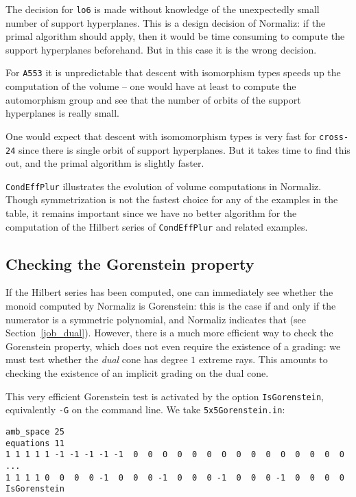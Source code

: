 \documentclass[12pt,a4paper]{scrartcl}
\theoremstyle{definition}
\def\ttt{\texttt}
\begin{document}
The decision for \ttt{lo6} is made without knowledge of the unexpectedly small number of support hyperplanes. This is a design decision of Normaliz: if the primal algorithm should apply, then it would be time consuming to compute the support hyperplanes beforehand. But in this case it is the wrong decision. 

For \ttt{A553} it is unpredictable that descent with isomorphism types speeds up the computation of the volume -- one would have at least to compute the automorphism group and see that the number of orbits of the support hyperplanes is really small.

One would expect that descent with isomomorphism types is very fast for \ttt{cross-24} since there is single orbit of support hyperplanes. But it takes time to find this out, and the primal algorithm is slightly faster.

\ttt{CondEffPlur} illustrates the evolution of volume computations in Normaliz. Though symmetrization is not the fastest choice for any of the examples in the table, it remains important since we have no better algorithm for the computation of the Hilbert series of \ttt{CondEffPlur} and related examples.

\subsection{Checking the Gorenstein property}\label{Gorenstein}

If the Hilbert series has been computed, one can immediately see whether the monoid computed by Normaliz is Gorenstein: this is the case if and only if the numerator is a symmetric polynomial, and Normaliz indicates that (see Section~\ref{job_dual}). However, there is a much more efficient way to check the Gorenstein property, which does not even require the existence of a grading: we must test whether the \emph{dual} cone has degree $1$ extreme rays. This amounts to checking the existence of an implicit grading on the dual cone.

This very efficient Gorenstein test is activated by the option \ttt{IsGorenstein}, equivalently \ttt{-G} on the command line. We take \verb|5x5Gorenstein.in|:

\begin{Verbatim}
amb_space 25
equations 11
1 1 1 1 1 -1 -1 -1 -1 -1  0  0  0  0  0  0  0  0  0  0  0  0  0  0  0
...
1 1 1 1 0  0  0  0 -1  0  0  0 -1  0  0  0 -1  0  0  0 -1  0  0  0  0
IsGorenstein
\end{Verbatim}
\end{document}
